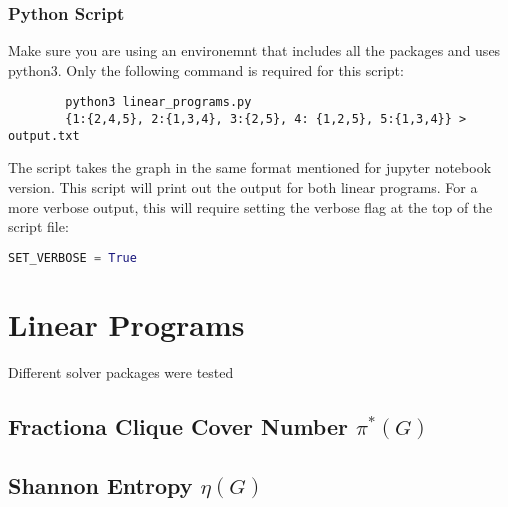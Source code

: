 \documentclass[11pt]{article}
\begin{document}
    \subsubsection*{Python Script}
    Make sure you are using an environemnt that includes all the packages and uses python3. Only the following command is required for this script:
    \begin{lstlisting}
        python3 linear_programs.py 
        {1:{2,4,5}, 2:{1,3,4}, 3:{2,5}, 4: {1,2,5}, 5:{1,3,4}} > output.txt
    \end{lstlisting}
    The script takes the graph in the same format mentioned for jupyter notebook version. This script will print out the output for both linear programs. For a more verbose output, this will require setting the verbose flag at the top of the script file:
    \begin{lstlisting}[language=Python]
        SET_VERBOSE = True
    \end{lstlisting}
    \section*{Linear Programs}
    Different solver packages were tested 
    \subsection*{Fractiona Clique Cover Number $\pi^*(G)$}
    \subsection*{Shannon Entropy $\eta(G)$ }
\end{document}
